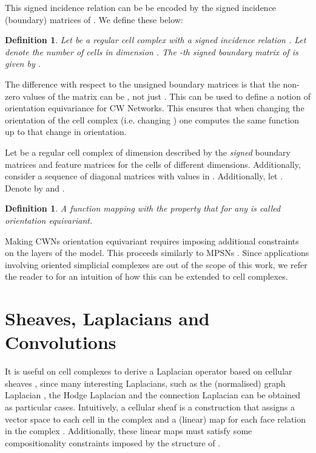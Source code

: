 \documentclass{article}
\newtheorem{definition}[theorem]{Definition}
\begin{document}
This signed incidence relation can be be encoded by the signed incidence (boundary) matrices of . We define these below:

\begin{definition}
Let  be a regular cell complex with a signed incidence relation . Let  denote the number of cells in dimension . The -th signed boundary matrix  of  is given by . 
\end{definition}

The difference with respect to the unsigned boundary matrices is that the non-zero values of the matrix can be , not just . This can be used to define a notion of orientation equivariance for CW Networks. This ensures that when changing the orientation of the cell complex  (i.e. changing ) one computes the same function up to that change in orientation. 

Let  be a regular cell complex of dimension  described by the \emph{signed} boundary matrices  and feature matrices  for the cells of different dimensions. Additionally, consider a sequence of diagonal matrices  with values in . Additionally, let . Denote by  and .

\begin{definition}
A function  mapping  with the property that  for any  is called  orientation equivariant. 
\end{definition}

Making CWNs orientation equivariant requires imposing additional constraints on the layers of the model. This proceeds similarly to MPSNs \citep{bodnar2021weisfeiler}. Since applications involving oriented simplicial complexes are out of the scope of this work, we refer the reader to \citet{bodnar2021weisfeiler} for an intuition of how this can be extended to cell complexes. 

\section{Sheaves, Laplacians and Convolutions}\label{app:convs}

It is useful on cell complexes to derive a Laplacian operator based on cellular sheaves \citep{HGh19}, since many interesting Laplacians, such as the (normalised) graph Laplacian \citep{ChGr1997}, the Hodge Laplacian \citep{schaub2020random} and the connection Laplacian \citep{SW12} can be obtained as particular cases. Intuitively, a cellular sheaf is a construction that assigns a vector space to each cell in the complex and a (linear) map for each face relation in the complex . Additionally, these linear maps must satisfy some compositionality constraints imposed by the structure of . 
\end{document}
